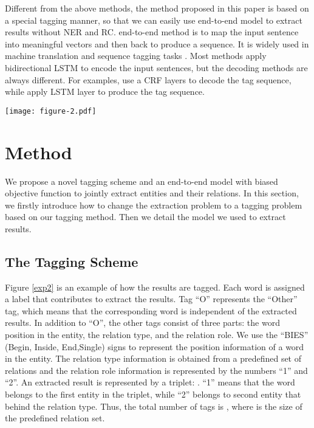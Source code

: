\documentclass[11pt,a4paper]{article}
\begin{document}
Different from the above methods, the method proposed in this paper is based on a special tagging manner,
so that we can easily use end-to-end model to extract results without NER and RC.
end-to-end method is to map the input sentence into meaningful vectors and then back to produce a sequence.
 It is widely used in machine translation \cite{13end2end,sutskever2014sequence}  and sequence tagging tasks \cite{lstm-crf,supertagging}.
Most methods apply bidirectional LSTM to encode the input sentences,
but the decoding methods are always different. For examples,
\cite{lstm-crf} use a CRF layers to decode the tag sequence, while \cite{supertagging,katiyarinvestigating} apply LSTM layer to produce the tag sequence.
\begin{figure*}
 \begin{center}
\texttt{[image: figure-2.pdf]}
\caption{\label{exp2}Gold standard annotation for an example sentence based on our tagging scheme, where ``CP'' is short for ``Country-President'' and ``CF'' is short for ``Company-Founder''.}
 \end{center}
\end{figure*}
\section{Method}
We propose a novel tagging scheme and an end-to-end model with biased objective function
to jointly extract entities and their relations.
In this section, we firstly introduce how to change the extraction problem to a tagging problem based on our tagging method.
Then we detail the model we used to extract results.
\subsection{The Tagging Scheme}
Figure \ref{exp2} is an example of how the results are tagged.
Each word is assigned a label that contributes to extract the results.
Tag ``O'' represents the ``Other'' tag, which means that the corresponding word is independent of the extracted results.
In addition to ``O'', the other tags consist of three parts:
the word position in the entity, the relation type, and the relation role.
We use the ``BIES'' (Begin, Inside, End,Single) signs to represent the position information of a word in the entity.
The relation type information is obtained from  a predefined set of relations and
the relation role information is represented by the numbers ``1'' and ``2''.
An extracted result is represented by a triplet: .
``1'' means that the word belongs to the first entity in the triplet,
while ``2'' belongs to second entity that behind the relation type.
Thus, the total number of tags is , where  is the size of the predefined relation set.
\end{document}
